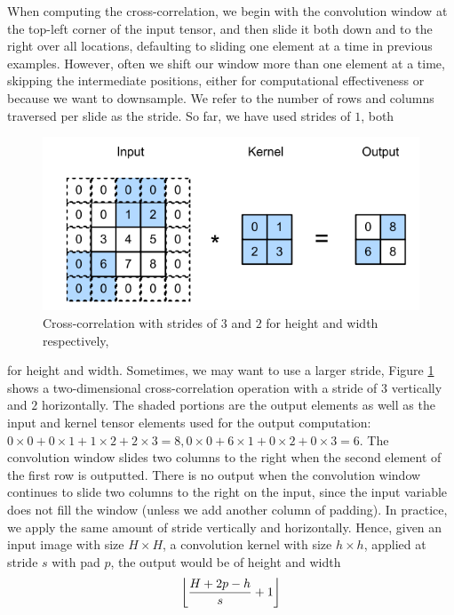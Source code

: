 \documentclass[12pt]{report}
\numberwithin{equation}{section}
\DeclarePairedDelimiter\floor{\lfloor}{\rfloor}
\begin{document}
When computing the cross-correlation, we begin with the convolution window at the top-left corner of the input tensor, and then slide it both down and to the right over all locations, defaulting to sliding one element at a time in previous examples. However, often we shift our window more than one element at a time, skipping the intermediate positions, either for computational effectiveness or because we want to downsample. We refer to the number of rows and columns traversed per slide as the stride. So far, we have used strides of $1$, both 
\begin{figure}[H]
\centering
\includegraphics[scale=0.9]{png/stride.png}
\caption[Cross-correlation with strides of $3$ and $2$ for height and width respectively]{Cross-correlation with strides of $3$ and $2$ for height and width respectively, {\cite{zhang2020dive}}}
\label{fig:stride}
\end{figure} \noindent
for height and width. Sometimes, we may want to use a larger stride, Figure \ref{fig:stride} shows a two-dimensional cross-correlation operation with a stride of $3$ vertically and $2$ horizontally. The shaded portions are the output elements as well as the input and kernel tensor elements used for the output computation: $0 \times 0 + 0 \times 1 + 1 \times 2 + 2 \times 3 = 8, 0 \times 0 + 6 \times 1 + 0 \times 2 + 0 \times 3 = 6$. The convolution window slides two columns to the right when the second element of the first row is outputted. There is no output when the convolution window continues to slide two columns to the right on the input, since the input variable does not fill the window (unless we add another column of padding). In practice, we apply the same amount of stride vertically and horizontally. Hence, given an input image with size $H \times H$, a convolution kernel with size $h \times h$, applied at stride $s$ with pad $p$, the output would be of height and width
\begin{equation}\label{eqn:pad_stride}
\floor*{\dfrac{H + 2p - h}{s} + 1}
\end{equation}
\end{document}
